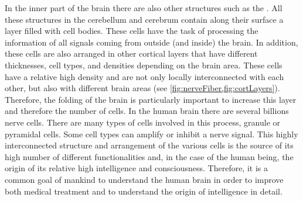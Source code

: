 \par
%
In the inner part of the brain there are also other structures such as the \dummy{}.
All these structures in the cerebellum and cerebrum contain along their surface a layer filled with cell bodies.
These cells have the task of processing the information of all signals coming from outside (and inside) the brain.
In addition, these cells are also arranged in other cortical layers that have different thicknesses, cell types, and densities depending on the brain area.
These cells have a relative high density and are not only locally interconnected with each other, but also with different brain areas (see \cref{fig:nerveFiber,fig:cortLayers}).
Therefore, the folding of the brain is particularly important to increase this layer and therefore the number of cells.
In the human brain there are several billions nerve cells.
There are many types of cells involved in this process, \eg{} granule or pyramidal cells.
Some cell types can amplify or inhibit a nerve signal.
This highly interconnected structure and arrangement of the various cells is the source of its high number of different functionalities and, in the case of the human being, the origin of its relative high intelligence and consciousness.
Therefore, it is a common goal of mankind to understand the human brain in order to improve both medical treatment and to understand the origin of intelligence in detail.
%
%
%
